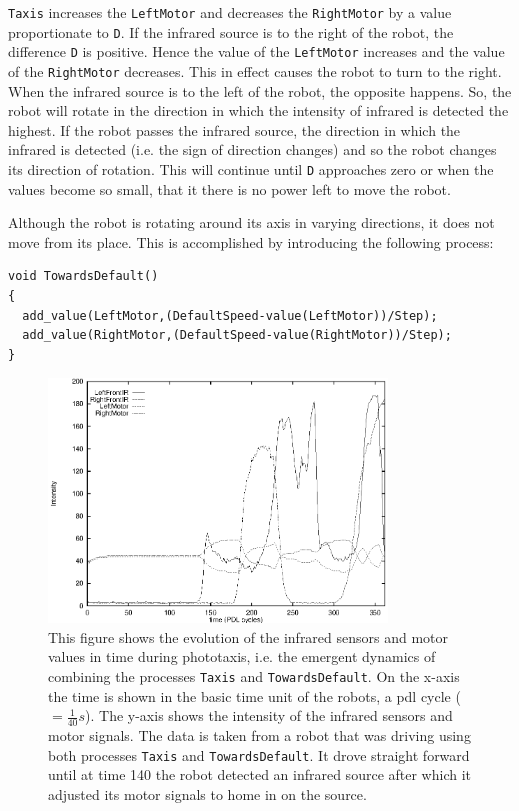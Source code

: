 \texttt{Taxis} increases the \texttt{LeftMotor} and decreases the \texttt{RightMotor} by a value proportionate to \texttt{D}. If the infrared source is to the right of the robot, the difference \texttt{D} is positive. Hence the value of the \texttt{LeftMotor} increases and the value of the \texttt{RightMotor} decreases. This in effect causes the robot to turn to the right. When the infrared source is to the left of the robot, the opposite happens. So, the robot will rotate in the direction in which the intensity of infrared is detected the highest. If the robot passes the infrared source, the direction in which the infrared is detected (i.e. the sign of direction changes) and so the robot changes its direction of rotation. This will continue until \texttt{D} approaches zero or when the values become so small, that it there is no power left to move the robot.

Although the robot is rotating around its axis in varying directions, it does not move from its place. This is accomplished by introducing the following process:


\begin{lstlisting}
void TowardsDefault()
{
  add_value(LeftMotor,(DefaultSpeed-value(LeftMotor))/Step);
  add_value(RightMotor,(DefaultSpeed-value(RightMotor))/Step);
}
\end{lstlisting}


\begin{figure}
\centerline{\includegraphics[width=9cm]{robots//irtaxis.eps}}
\caption{This figure shows the evolution of the infrared sensors and motor values in time during phototaxis, i.e. the emergent dynamics of combining the processes \texttt{Taxis} and \texttt{TowardsDefault}. On the x-axis the time is shown in the basic time unit of the robots, a {\sc pdl} cycle ($= \frac{1}{40} s$). The y-axis shows the intensity of the infrared sensors and motor signals. The data is taken from a robot that was driving using both processes \texttt{Taxis} and \texttt{TowardsDefault}. It drove straight forward until at time 140 the robot detected an infrared source after which it adjusted its motor signals to home in on the source.}
\label{f:irtaxis}
\end{figure}



